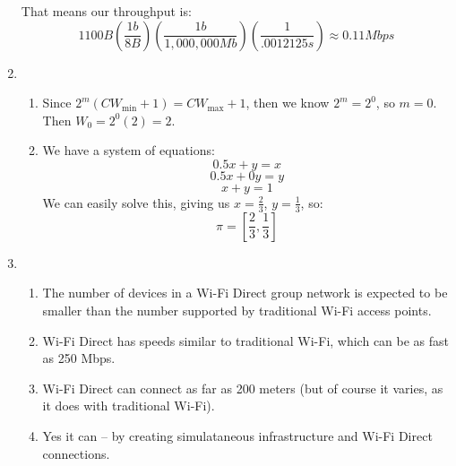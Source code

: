 \begin{enumerate}
    That means our throughput is:
    $$1100B(\frac{1b}{8B})(\frac{1 b}{1,000,000 Mb})(\frac{1}{.0012125 s}) \approx 0.11 Mbps $$

  \item 
    \begin{enumerate}
      \item 
        Since $2^m(CW_{\min} + 1) = CW_{\max} + 1$, then we know $2^m = 2^0$, so $m = 0$. Then $W_0 = 2^0(2) = 2$.
        \begin{figure}[H]
        \end{figure}


      \item We have a system of equations:
        $$0.5x + y = x$$
        $$0.5x + 0y = y$$
        $$x + y = 1$$
        We can easily solve this, giving us $x = \frac{2}{3}$, $y = \frac{1}{3}$, so:
        $$\pi = [\frac{2}{3},\frac{1}{3}]$$
    \end{enumerate}

  \item 
    \begin{enumerate}
      \item The number of devices in a Wi-Fi Direct group network is expected to be smaller than the number supported by traditional Wi-Fi access points.
      \item Wi-Fi Direct has speeds similar to traditional Wi-Fi, which can be as fast as 250 Mbps.
      \item Wi-Fi Direct can connect as far as 200 meters (but of course it varies, as it does with traditional Wi-Fi).
      \item Yes it can -- by creating simulataneous infrastructure and Wi-Fi Direct connections.
    \end{enumerate}
\end{enumerate}


